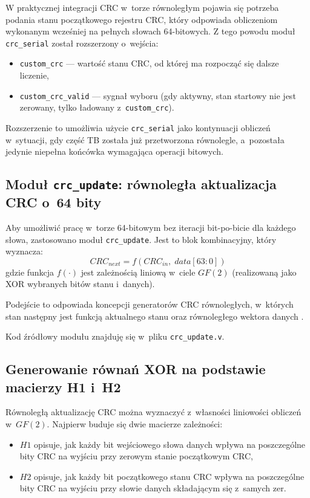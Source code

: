 W praktycznej integracji CRC w~torze równoległym pojawia się potrzeba podania stanu początkowego rejestru CRC, który odpowiada obliczeniom wykonanym wcześniej na pełnych słowach 64-bitowych. Z tego powodu moduł \texttt{crc\_serial} został rozszerzony o~wejścia:
\begin{itemize}
    \item \texttt{custom\_crc} --- wartość stanu CRC, od której ma rozpocząć się dalsze liczenie,
    \item \texttt{custom\_crc\_valid} --- sygnał wyboru (gdy aktywny, stan startowy nie jest zerowany, tylko ładowany z~\texttt{custom\_crc}).
\end{itemize}

Rozszerzenie to umożliwia użycie \texttt{crc\_serial} jako kontynuacji obliczeń w~sytuacji, gdy część TB została już przetworzona równolegle, a~pozostała jedynie niepełna końcówka wymagająca operacji bitowych.


\subsection{Moduł \texttt{crc\_update}: równoległa aktualizacja CRC o~64 bity}
\label{subsec:crc_update}

Aby umożliwić pracę w~torze 64-bitowym bez iteracji bit-po-bicie dla każdego słowa, zastosowano moduł \texttt{crc\_update}. Jest to blok kombinacyjny, który wyznacza:
\[
CRC_{next} = f(CRC_{in},\; data[63:0])
\]
gdzie funkcja $f(\cdot)$ jest zależnością liniową w~ciele $GF(2)$ (realizowaną jako XOR wybranych bitów stanu i~danych).

Podejście to odpowiada koncepcji generatorów CRC równoległych, w~których stan następny jest funkcją aktualnego stanu oraz równoległego wektora danych \cite{bib:stavinov2010_parallel_crc_gen}.

Kod źródłowy modułu znajduję się w~pliku \texttt{crc\_update.v}.


\subsection{Generowanie równań XOR na podstawie macierzy H1 i~H2}
\label{subsec:crc_update_generation}

Równoległą aktualizację CRC można wyznaczyć z~własności liniowości obliczeń w~$GF(2)$. Najpierw buduje się dwie macierze zależności:
\begin{itemize}
  \item $H1$ opisuje, jak każdy bit wejściowego słowa danych wpływa na poszczególne bity CRC na wyjściu przy zerowym stanie początkowym CRC,
  \item $H2$ opisuje, jak każdy bit początkowego stanu CRC wpływa na poszczególne bity CRC na wyjściu przy słowie danych składającym się z~samych zer.
\end{itemize}

